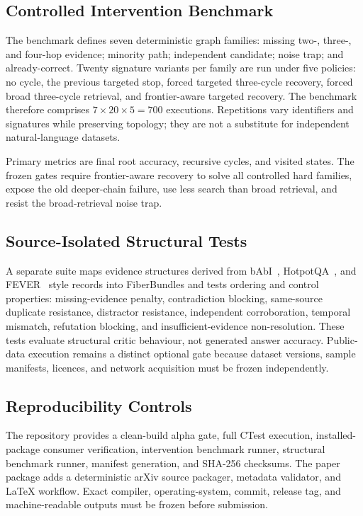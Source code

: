 \documentclass[10pt]{article}
\begin{document}
\subsection{Controlled Intervention Benchmark}
The benchmark defines seven deterministic graph families: missing two-, three-, and four-hop evidence; minority path; independent candidate; noise trap; and already-correct. Twenty signature variants per family are run under five policies: no cycle, the previous targeted stop, forced targeted three-cycle recovery, forced broad three-cycle retrieval, and frontier-aware targeted recovery. The benchmark therefore comprises $7\times20\times5=700$ executions. Repetitions vary identifiers and signatures while preserving topology; they are not a substitute for independent natural-language datasets.

Primary metrics are final root accuracy, recursive cycles, and visited states. The frozen gates require frontier-aware recovery to solve all controlled hard families, expose the old deeper-chain failure, use less search than broad retrieval, and resist the broad-retrieval noise trap.

\subsection{Source-Isolated Structural Tests}
A separate suite maps evidence structures derived from bAbI~\cite{weston2015babi}, HotpotQA~\cite{yang2018hotpotqa}, and FEVER~\cite{thorne2018fever} style records into FiberBundles and tests ordering and control properties: missing-evidence penalty, contradiction blocking, same-source duplicate resistance, distractor resistance, independent corroboration, temporal mismatch, refutation blocking, and insufficient-evidence non-resolution. These tests evaluate structural critic behaviour, not generated answer accuracy. Public-data execution remains a distinct optional gate because dataset versions, sample manifests, licences, and network acquisition must be frozen independently.

\subsection{Reproducibility Controls}
The repository provides a clean-build alpha gate, full CTest execution, installed-package consumer verification, intervention benchmark runner, structural benchmark runner, manifest generation, and SHA-256 checksums. The paper package adds a deterministic arXiv source packager, metadata validator, and LaTeX workflow. Exact compiler, operating-system, commit, release tag, and machine-readable outputs must be frozen before submission.
\end{document}
